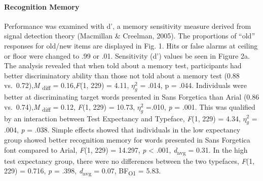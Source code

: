 \documentclass[
  english,
  jou]{apa6}
\let\oldparagraph\paragraph
\renewcommand{\paragraph}[1]{\oldparagraph{#1}\mbox{}}
\begin{document}
\hypertarget{recognition-memory}{%
\paragraph{Recognition Memory}\label{recognition-memory}}

Performance was examined with d', a memory sensitivity measure derived from signal detection theory (Macmillan \& Creelman, 2005). The proportions of \enquote{old} responses for old/new items are displayed in Fig. 1. Hits or false alarms at ceiling or floor were changed to .99 or .01. Sensitivity (d') values be seen in Figure 2a. The analysis revealed that when told about a memory test, participants had better discriminatory ability than those not told about a memory test (0.88 vs.~0.72),\emph{M} \textsubscript{diff} = 0.16,\emph{F}(1, 229) = 4.11, \(\eta_{g}^{2}\) = .014, p = .044. Individuals were better at discriminating target words presented in Sans Forgetica than Arial (0.86 vs.~0.74),\emph{M} \textsubscript{diff} = 0.12, \emph{F}(1, 229) = 10.73, \(\eta_{g}^{2}\) =.010, \emph{p} = .001. This was qualified by an interaction between Test Expectancy and Typeface, \emph{F}(1, 229) = 4.34, \(\eta_{g}^{2}\) = .004, \emph{p} = .038. Simple effects showed that individuals in the low expectancy group showed better recognition memory for words presented in Sans Forgetica font compared to Arial, \emph{F}(1, 229) = 14.297, \emph{p} \textless{} .001, \emph{d}\textsubscript{avg} = 0.31. In the high test expectancy group, there were no differences between the two typefaces, \emph{F}(1, 229) = 0.716, \emph{p} = .398, \emph{d}\textsubscript{avg} = 0.07, BF\textsubscript{O1} = 5.83.
\end{document}
